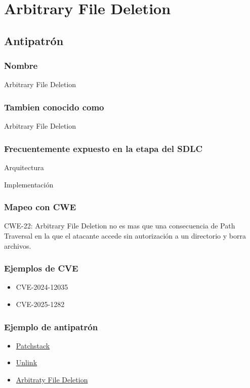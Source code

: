 \chapter{Arbitrary File Deletion}
\section{Antipatrón}
\subsection*{Nombre}
Arbitrary File Deletion
\subsection*{Tambien conocido como}
Arbitrary File Deletion

\subsection*{Frecuentemente expuesto en la etapa del SDLC}
Arquitectura

Implementación
\subsection*{Mapeo con CWE}
CWE-22: Arbitrary File Deletion no es mas que una consecuencia de Path Traversal en la que el atacante accede sin autorización a un directorio y borra archivos.
\subsection*{Ejemplos de CVE}
\begin{itemize}
    \item CVE-2024-12035
    \item CVE-2025-1282
\end{itemize}
\subsection*{Ejemplo de antipatrón}
\begin{itemize}
    \item \href{https://patchstack.com/articles/common-plugin-vulnerabilities-how-to-fix-them/}{Patchstack}
    \item \href{https://www.php.net/unlink}{Unlink}
    \item \href{https://patchstack.com/academy/wordpress/vulnerabilities/arbitrary-file-deletion/}{Arbitraty File Deletion}
\end{itemize}

